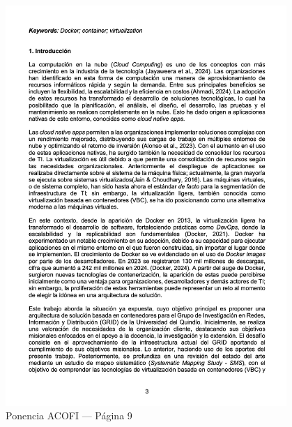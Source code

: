 \begin{figure}[H]
	\centering
	\begin{tcolorbox}[
			colback=white,
			colframe=gray!50,
			boxrule=1pt,
			arc=2pt,
			boxsep=5pt,
			left=3pt,
			right=3pt,
			top=3pt,
			bottom=3pt,
			drop shadow
		]
		\includegraphics[width=0.95\textwidth,keepaspectratio]{apendices/ACOFI/pagina_9.png}
	\end{tcolorbox}
	\caption{Ponencia ACOFI --- Página 9}\label{fig:acofi-pagina-9}
\end{figure}
\FloatBarrier%

